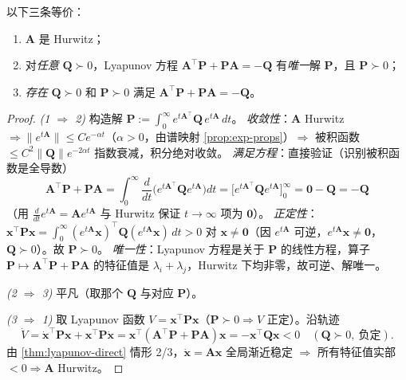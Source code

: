 \begin{theorem}\label{thm:lyapunov-eq}
以下三条等价：
\begin{enumerate}
  \item $\mathbf{A}$ 是 Hurwitz；
  \item 对\emph{任意} $\mathbf{Q}\succ0$，Lyapunov 方程 $\mathbf{A}^\top\mathbf{P}+\mathbf{P}\mathbf{A}=-\mathbf{Q}$ 有\emph{唯一}解 $\mathbf{P}$，且 $\mathbf{P}\succ0$；
  \item \emph{存在} $\mathbf{Q}\succ0$ 和 $\mathbf{P}\succ0$ 满足 $\mathbf{A}^\top\mathbf{P}+\mathbf{P}\mathbf{A}=-\mathbf{Q}$。
\end{enumerate}
\end{theorem}
\begin{proof}
\emph{(1 $\Rightarrow$ 2)} 构造解 $\mathbf{P}:=\displaystyle\int_0^\infty e^{t\mathbf{A}^\top}\mathbf{Q}\,e^{t\mathbf{A}}\,dt$。
\emph{收敛性}：$\mathbf{A}$ Hurwitz $\Rightarrow\|e^{t\mathbf{A}}\|\le Ce^{-\alpha t}$（$\alpha>0$，由谱映射 \cref{prop:exp-props}）$\Rightarrow$ 被积函数 $\le C^2\|\mathbf{Q}\|e^{-2\alpha t}$ 指数衰减，积分绝对收敛。
\emph{满足方程}：直接验证（识别被积函数是全导数）
\[
  \mathbf{A}^\top\mathbf{P}+\mathbf{P}\mathbf{A}=\int_0^\infty\frac{d}{dt}\bigl(e^{t\mathbf{A}^\top}\mathbf{Q}e^{t\mathbf{A}}\bigr)dt=\bigl[e^{t\mathbf{A}^\top}\mathbf{Q}e^{t\mathbf{A}}\bigr]_0^\infty=\mathbf{0}-\mathbf{Q}=-\mathbf{Q}
\]
（用 $\frac{d}{dt}e^{t\mathbf{A}}=\mathbf{A}e^{t\mathbf{A}}$ 与 Hurwitz 保证 $t\to\infty$ 项为 $\mathbf{0}$）。
\emph{正定性}：$\mathbf{x}^\top\mathbf{P}\mathbf{x}=\int_0^\infty(e^{t\mathbf{A}}\mathbf{x})^\top\mathbf{Q}(e^{t\mathbf{A}}\mathbf{x})\,dt>0$ 对 $\mathbf{x}\neq\mathbf{0}$（因 $e^{t\mathbf{A}}$ 可逆，$e^{t\mathbf{A}}\mathbf{x}\neq\mathbf{0}$，$\mathbf{Q}\succ0$）。故 $\mathbf{P}\succ0$。
\emph{唯一性}：Lyapunov 方程是关于 $\mathbf{P}$ 的线性方程，算子 $\mathbf{P}\mapsto\mathbf{A}^\top\mathbf{P}+\mathbf{P}\mathbf{A}$ 的特征值是 $\lambda_i+\lambda_j$，Hurwitz 下均非零，故可逆、解唯一。

\emph{(2 $\Rightarrow$ 3)} 平凡（取那个 $\mathbf{Q}$ 与对应 $\mathbf{P}$）。

\emph{(3 $\Rightarrow$ 1)} 取 Lyapunov 函数 $V=\mathbf{x}^\top\mathbf{P}\mathbf{x}$（$\mathbf{P}\succ0\Rightarrow V$ 正定）。沿轨迹
\[
  \dot V=\dot{\mathbf{x}}^\top\mathbf{P}\mathbf{x}+\mathbf{x}^\top\mathbf{P}\dot{\mathbf{x}}=\mathbf{x}^\top(\mathbf{A}^\top\mathbf{P}+\mathbf{P}\mathbf{A})\mathbf{x}=-\mathbf{x}^\top\mathbf{Q}\mathbf{x}<0\quad(\mathbf{Q}\succ0,\ \text{负定}).
\]
由 \cref{thm:lyapunov-direct} 情形 2/3，$\dot{\mathbf{x}}=\mathbf{A}\mathbf{x}$ 全局渐近稳定 $\Rightarrow$ 所有特征值实部 $<0\Rightarrow\mathbf{A}$ Hurwitz。
\end{proof}

